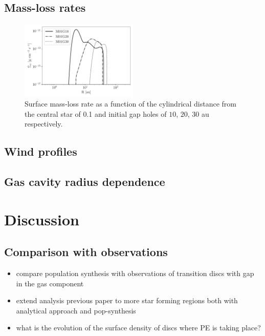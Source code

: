 \documentclass[usenatbib,useAMS,usedcolumn]{mnras}
\begin{document}
\subsection{Mass-loss rates}\label{sec:mdot}

\begin{figure}
   \centering
   \includegraphics[width=0.5\textwidth]{Sigmadot01}
   \caption{Surface mass-loss rate as a function of the cylindrical distance from the central star of \SI{0.1}{\solarmass} and initial gap holes of $10$, $20$, $30$ au respectively. 
   \label{fig:Sigmadot01}}
\end{figure}

\subsection{Wind profiles}\label{sec:wind-prof}

\subsection{Gas cavity radius dependence}\label{sec:gap-dependance}

\section{Discussion}\label{sec:discussion}

\subsection{Comparison with observations}

\begin{itemize}
   \item compare population synthesis with observations of transition discs with gap in the gas component
   \item extend analysis previous paper to more star forming regions both with analytical approach and pop-synthesis
   \item what is the evolution of the surface density of discs where PE is taking place?
\end{itemize}
\end{document}

